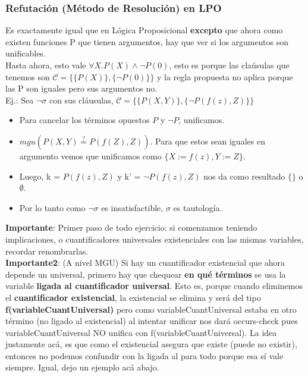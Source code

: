 \documentclass[10pt,a4paper]{article}
\begin{document}
\subsubsection*{Refutación (Método de Resolución) en LPO}
Es exactamente igual que en Lógica Proposicional \textbf{excepto} que ahora como existen funciones P que tienen argumentos, hay que ver si los argumentos son unificables. \\
Hasta ahora, esto vale $\forall X . P(X) \land \neg P(0)$, esto es porque las claúsulas que tenemos son $\mathcal{C} = \{\{P(X)\}, \{\neg P(0)\}\}$ y la regla propuesta no aplica porque las P son iguales pero sus argumentos no. \\
Ej.: Sea $\neg \sigma$ con sus cláusulas, $\mathcal{C} = \{\{P(X,Y)\}, \{\neg P(f(z), Z)\}\}$
\begin{itemize}
    \item Para cancelar los términos opuestos $P$ y $\neg P$, unificamos.
    \item $mgu(P(X,Y) \stackrel{?}{=}P(f(Z), Z))$. Para que estos sean iguales en argumento vemos que unificamos como $\{X := f(z), Y := Z\}$.
    \item Luego, k = $P(f(z), Z)$ y k' = $\neg P(f(z), Z)$ nos da como resultado $\{\}$ o $\emptyset$.
    \item Por lo tanto como $\neg \sigma$ es insatisfactible, $\sigma$ es tautología.
\end{itemize}
\textbf{Importante}: Primer paso de todo ejercicio: si comenzamos teniendo implicaciones, o cuantificadores universales existenciales con las mismas variables, recordar renombrarlas. \\
\textbf{Importante2}: (A nivel MGU) Si hay un cuantificador existencial que ahora depende un universal, primero hay que chequear \textbf{en qué términos} se usa la variable \textbf{ligada al cuantificador universal}. Esto es, porque cuando eliminemos el \textbf{cuantificador existencial}, la existencial se elimina y será del tipo \textbf{f(variableCuantUniversal)} pero como variableCuantUniversal estaba en otro término (no ligado al existencial) al intentar unificar nos dará occurs-check pues variableCuantUniversal NO unifica con f(variableCuantUniversal). La idea justamente acá, es que como el existencial asegura que existe (puede no existir), entonces no podemos confundir con la ligada al para todo porque esa sí vale siempre. Igual, dejo un ejemplo acá abajo.
\end{document}
